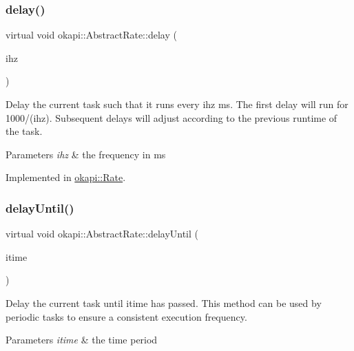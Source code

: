 \subsubsection{\texorpdfstring{delay()}{delay()}\hspace{0.1cm}{\footnotesize\ttfamily [2/2]}}
{\footnotesize\ttfamily virtual void okapi\+::\+Abstract\+Rate\+::delay (\begin{DoxyParamCaption}\item[{int}]{ihz }\end{DoxyParamCaption})\hspace{0.3cm}{\ttfamily [pure virtual]}}

Delay the current task such that it runs every ihz ms. The first delay will run for 1000/(ihz). Subsequent delays will adjust according to the previous runtime of the task.


\begin{DoxyParams}{Parameters}
{\em ihz} & the frequency in ms \\
\hline
\end{DoxyParams}


Implemented in \mbox{\hyperlink{classokapi_1_1Rate_a302ef2dc3cece68cd0125934c71936cc}{okapi\+::\+Rate}}.

\mbox{\label{classokapi_1_1AbstractRate_a53a15074ca3bd0787ce34d30c068d9b2}} 
\subsubsection{\texorpdfstring{delayUntil()}{delayUntil()}\hspace{0.1cm}{\footnotesize\ttfamily [1/2]}}
{\footnotesize\ttfamily virtual void okapi\+::\+Abstract\+Rate\+::delay\+Until (\begin{DoxyParamCaption}\item[{Q\+Time}]{itime }\end{DoxyParamCaption})\hspace{0.3cm}{\ttfamily [pure virtual]}}

Delay the current task until itime has passed. This method can be used by periodic tasks to ensure a consistent execution frequency.


\begin{DoxyParams}{Parameters}
{\em itime} & the time period \\
\hline
\end{DoxyParams}



